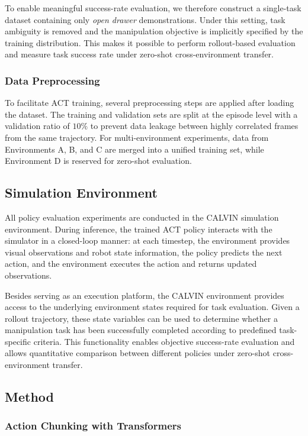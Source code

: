 To enable meaningful success-rate evaluation, we therefore construct a single-task dataset containing only \textit{open drawer} demonstrations. Under this setting, task ambiguity is removed and the manipulation objective is implicitly specified by the training distribution. This makes it possible to perform rollout-based evaluation and measure task success rate under zero-shot cross-environment transfer.

\subsubsection{Data Preprocessing}

To facilitate ACT training, several preprocessing steps are applied after loading the dataset. The training and validation sets are split at the episode level with a validation ratio of $10\%$ to prevent data leakage between highly correlated frames from the same trajectory. For multi-environment experiments, data from Environments A, B, and C are merged into a unified training set, while Environment D is reserved for zero-shot evaluation.

\subsection{Simulation Environment}

All policy evaluation experiments are conducted in the CALVIN simulation environment. During inference, the trained ACT policy interacts with the simulator in a closed-loop manner: at each timestep, the environment provides visual observations and robot state information, the policy predicts the next action, and the environment executes the action and returns updated observations.

Besides serving as an execution platform, the CALVIN environment provides access to the underlying environment states required for task evaluation. Given a rollout trajectory, these state variables can be used to determine whether a manipulation task has been successfully completed according to predefined task-specific criteria. This functionality enables objective success-rate evaluation and allows quantitative comparison between different policies under zero-shot cross-environment transfer.

\subsection{Method}

\subsubsection{Action Chunking with Transformers}

